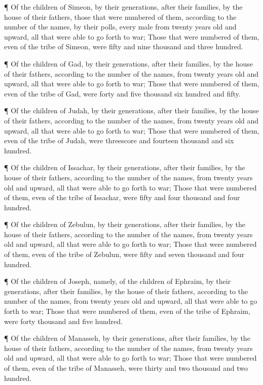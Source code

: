  ¶ Of the children of Simeon, by their generations, after
their families, by the house of their fathers, those that were numbered
of them, according to the number of the names, by their polls, every
male from twenty years old and upward, all that were able to go forth to
war;  Those that were numbered of them, even of the tribe
of Simeon, were fifty and nine thousand and three hundred.

 ¶ Of the children of Gad, by their generations, after
their families, by the house of their fathers, according to the number
of the names, from twenty years old and upward, all that were able to go
forth to war;  Those that were numbered of them, even of
the tribe of Gad, were forty and five thousand six hundred and fifty.

 ¶ Of the children of Judah, by their generations, after
their families, by the house of their fathers, according to the number
of the names, from twenty years old and upward, all that were able to go
forth to war;  Those that were numbered of them, even of
the tribe of Judah, were threescore and fourteen thousand and six
hundred.

 ¶ Of the children of Issachar, by their generations, after
their families, by the house of their fathers, according to the number
of the names, from twenty years old and upward, all that were able to go
forth to war;  Those that were numbered of them, even of
the tribe of Issachar, were fifty and four thousand and four hundred.

 ¶ Of the children of Zebulun, by their generations, after
their families, by the house of their fathers, according to the number
of the names, from twenty years old and upward, all that were able to go
forth to war;  Those that were numbered of them, even of
the tribe of Zebulun, were fifty and seven thousand and four hundred.

 ¶ Of the children of Joseph, namely, of the children of
Ephraim, by their generations, after their families, by the house of
their fathers, according to the number of the names, from twenty years
old and upward, all that were able to go forth to war; 
Those that were numbered of them, even of the tribe of Ephraim, were
forty thousand and five hundred.

 ¶ Of the children of Manasseh, by their generations, after
their families, by the house of their fathers, according to the number
of the names, from twenty years old and upward, all that were able to go
forth to war;  Those that were numbered of them, even of
the tribe of Manasseh, were thirty and two thousand and two hundred.

